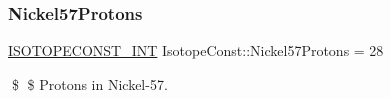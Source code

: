 \subsubsection{\texorpdfstring{Nickel57\+Protons}{Nickel57Protons}}
{\footnotesize\ttfamily \mbox{\hyperlink{group___isotope_const-_macros_ga5f18360b3e99483a35c32d789e62621c}{I\+S\+O\+T\+O\+P\+E\+C\+O\+N\+S\+T\+\_\+\+I\+NT}} Isotope\+Const\+::\+Nickel57\+Protons = 28}

\$ \$ Protons in Nickel-\/57. 